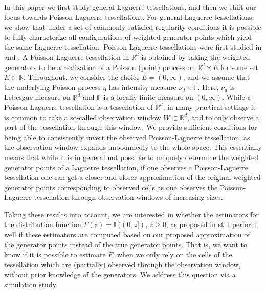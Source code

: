 \documentclass{article}
\newcommand{\RR}{\mathbb{R}}
\theoremstyle{plain}
\theoremstyle{remark}
\theoremstyle{definition}
\begin{document}
In this paper we first study general Laguerre tessellations, and then we shift our focus towards Poisson-Laguerre tessellations. For general Laguerre tessellations, we show that under a set of commonly satisfied regularity conditions it is possible to fully characterize all configurations of weighted generator points which yield the same Laguerre tessellation. Poisson-Laguerre tessellations were first studied in \cite{Lautensack2007} and \cite{Lautensack2008}. A Poisson-Laguerre tessellation in $\RR^d$ is obtained by taking the weighted generators to be a realization of a Poisson (point) process on $\RR^d \times E$ for some set $E \subset \RR$. Throughout, we consider the choice $E=(0,\infty)$, and we assume that the underlying Poisson process $\eta$ has intensity measure $\nu_d \times \mathbb{F}$. Here, $\nu_d$ is Lebesgue measure on $\RR^d$ and $\mathbb{F}$ is a locally finite measure on $(0,\infty)$. While a Poisson-Laguerre tessellation is a tessellation of $\RR^d$, in many practical settings it is common to take a so-called observation window $W \subset \RR^d$, and to only observe a part of the tessellation through this window. We provide sufficient conditions for being able to consistently invert the observed Poisson-Laguerre tessellation, as the observation window expands unboundedly to the whole space. This essentially means that while it is in general not possible to uniquely determine the weighted generator points of a Laguerre tessellation, if one observes a Poisson-Laguerre tessellation one can get a closer and closer approximation of the original weighted generator points corresponding to observed cells as one observes the Poisson-Laguerre tessellation through observation windows of increasing sizes. 

Taking these results into account, we are interested in whether the estimators for the distribution function $F(z) = \mathbb{F}((0,z])$, $z \geq 0$, as proposed in \cite{vdjagt2025b} still perform well if these estimators are computed based on our proposed approximation of the generator points instead of the true generator points. That is, we want to know if it is possible to estimate $F$, when we only rely on the cells of the tessellation which are (partially) observed through the observation window, without prior knowledge of the generators. We address this question via a simulation study.

\end{document}
